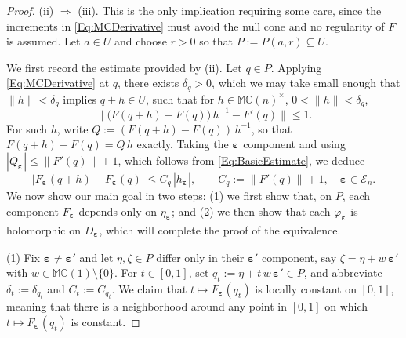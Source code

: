 \documentclass[12pt]{amsart}
\theoremstyle{plain}
\theoremstyle{definition}
\numberwithin{equation}{section}
\newcommand{\bep}[1]{\bm{\varepsilon_{#1}}}
\newcommand{\mC}{\mathbb{C}}
\newcommand{\mM}{\mathbb{M}}
\newcommand{\Ra}{\Rightarrow}
\begin{document}
\begin{proof}
    (ii) $\Ra$ (iii). This is the only implication requiring some care, since
    the increments in \eqref{Eq:MCDerivative} must avoid the null cone and no
    regularity of $F$ is assumed. Let $a \in U$ and choose $r > 0$ so that
    $P := P ( a , r ) \subseteq U$.

    We first record the estimate provided by (ii). Let $q \in P$. Applying
    \eqref{Eq:MCDerivative} at $q$, there exists
    $\delta_q > 0$, which we may take small enough that
    $\| h \| < \delta_q$ implies $q + h \in U$, such that for $h \in \mM \mC(n)^\times$, $0 < \| h \| < \delta_q$,
        \begin{equation}\label{Eq:BasicEstimate}
        \big\| \big( F ( q + h ) - F ( q ) \big)\, h^{-1} - F ' ( q ) \big\|
        \leq 1 .
        \end{equation}
    For such $h$, write $Q := ( F ( q + h ) - F ( q ) )\, h^{-1}$, so that
    $F ( q + h ) - F ( q ) = Q\, h$ exactly. Taking the $\bep{}$ component and
    using $| Q_{\bep{}} | \leq \| F ' ( q ) \| + 1$, which follows from
    \eqref{Eq:BasicEstimate}, we deduce
        \begin{equation}\label{Eq:ComponentEstimate}
        \big| F_{\bep{}} ( q + h ) - F_{\bep{}} ( q ) \big| \leq C_q\, | h_{\bep{}} | ,
        \qquad C_q := \| F ' ( q ) \| + 1 , \quad \bep{} \in \mathcal{E}_n.
        \end{equation}
    We now show our main goal in two steps: (1) we first show that, on $P$, each component $F_{\bep{}}$ depends only on $\eta_{\bep{}}$; and (2) we then show that each $\varphi_{\bep{}}$ is holomorphic on $D_{\bep{}}$, which will complete the proof of the equivalence.

    (1) Fix $\bep{} \neq \bep{}'$ and let $\eta , \zeta \in P$ differ only in their
    $\bep{}'$ component, say $\zeta = \eta + w\, \bep{}'$ with
    $w \in \mM \mC(1) \setminus \{ 0 \}$. For $t \in [ 0 , 1 ]$, set
    $q_t := \eta + t\, w\, \bep{}' \in P$, and abbreviate
    $\delta_t := \delta_{q_t}$ and $C_t := C_{q_t}$. We claim that
    $t \mapsto F_{\bep{}} ( q_t )$ is locally constant on $[ 0 , 1 ]$, meaning that there is a neighborhood around any point in $[0, 1]$ on which $t \mapsto F_{\bep{}} (q_t)$ is constant.


\end{proof}
\end{document}
